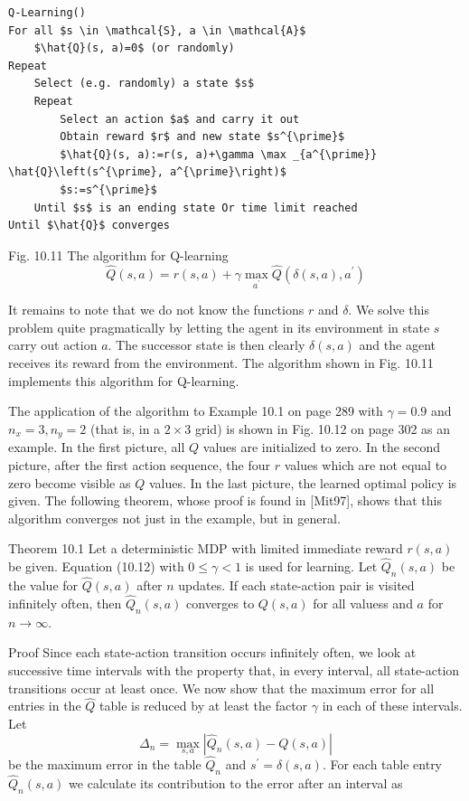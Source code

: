 \documentclass[10pt]{book}
\begin{document}
\begin{verbatim}
Q-Learning()
For all $s \in \mathcal{S}, a \in \mathcal{A}$
    $\hat{Q}(s, a)=0$ (or randomly)
Repeat
    Select (e.g. randomly) a state $s$
    Repeat
        Select an action $a$ and carry it out
        Obtain reward $r$ and new state $s^{\prime}$
        $\hat{Q}(s, a):=r(s, a)+\gamma \max _{a^{\prime}} \hat{Q}\left(s^{\prime}, a^{\prime}\right)$
        $s:=s^{\prime}$
    Until $s$ is an ending state Or time limit reached
Until $\hat{Q}$ converges
\end{verbatim}

Fig. 10.11 The algorithm for Q-learning
\begin{equation*}
\hat{Q}(s, a)=r(s, a)+\gamma \max _{a^{\prime}} \hat{Q}\left(\delta(s, a), a^{\prime}\right) \tag{10.12}
\end{equation*}

It remains to note that we do not know the functions $r$ and $\delta$. We solve this problem quite pragmatically by letting the agent in its environment in state $s$ carry out action $a$. The successor state is then clearly $\delta(s, a)$ and the agent receives its reward from the environment. The algorithm shown in Fig. 10.11 implements this algorithm for Q-learning.

The application of the algorithm to Example 10.1 on page 289 with $\gamma=0.9$ and $n_{x}=3, n_{y}=2$ (that is, in a $2 \times 3$ grid) is shown in Fig. 10.12 on page 302 as an example. In the first picture, all $Q$ values are initialized to zero. In the second picture, after the first action sequence, the four $r$ values which are not equal to zero become visible as $Q$ values. In the last picture, the learned optimal policy is given. The following theorem, whose proof is found in [Mit97], shows that this algorithm converges not just in the example, but in general.

\begin{displayquote}
Theorem 10.1 Let a deterministic MDP with limited immediate reward $r(s, a)$ be given. Equation (10.12) with $0 \leq \gamma<1$ is used for learning. Let $\hat{Q}_{n}(s, a)$ be the value for $\hat{Q}(s, a)$ after $n$ updates. If each state-action pair is visited infinitely often, then $\hat{Q}_{n}(s, a)$ converges to $Q(s, a)$ for all valuess and $a$ for $n \rightarrow \infty$.
\end{displayquote}

Proof Since each state-action transition occurs infinitely often, we look at successive time intervals with the property that, in every interval, all state-action transitions occur at least once. We now show that the maximum error for all entries in the $\hat{Q}$ table is reduced by at least the factor $\gamma$ in each of these intervals. Let
\begin{equation*}
\Delta_{n}=\max _{s, a}\left|\hat{Q}_{n}(s, a)-Q(s, a)\right|
\end{equation*}
be the maximum error in the table $\hat{Q}_{n}$ and $s^{\prime}=\delta(s, a)$. For each table entry $\hat{Q}_{n}(s, a)$ we calculate its contribution to the error after an interval as
\end{document}

